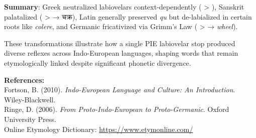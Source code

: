 \begin{technical}
\textbf{Summary}: Greek neutralized labiovelars context-dependently ( > ), Sanskrit palatalized ( >  → \textsanskrit{चक्र}), Latin generally preserved \emph{qu} but de-labialized in certain roots like \emph{colere}, and Germanic fricativized via Grimm's Law ( >  → \emph{wheel}).

\noindent
These transformations illustrate how a single PIE labiovelar stop produced diverse reflexes across Indo-European languages, shaping words that remain etymologically linked despite significant phonetic divergence.

\vspace{0.5em}
\noindent\textbf{References:}\\
{\footnotesize
Fortson, B. (2010). \textit{Indo-European Language and Culture: An Introduction}. Wiley-Blackwell.\\
Ringe, D. (2006). \textit{From Proto-Indo-European to Proto-Germanic}. Oxford University Press.\\
Online Etymology Dictionary: \url{https://www.etymonline.com/}\\
}
\end{technical}
